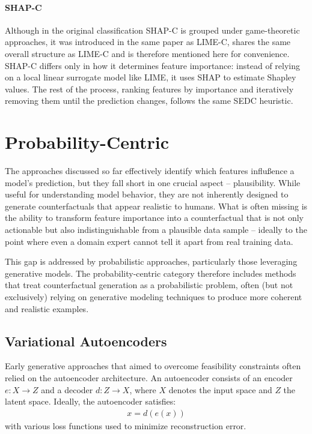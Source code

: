 \begin{methodparagraph}
    \paragraph{SHAP-C} Although in the original classification SHAP-C is grouped under game-theoretic approaches,
    it was introduced in the same paper as LIME-C, shares the same overall structure as LIME-C and is therefore mentioned here for convenience.
    SHAP-C differs only in how it determines feature importance: instead of relying on a local linear surrogate model like LIME,
    it uses SHAP \cite{lundberg2017unified} to estimate Shapley values.
    The rest of the process, ranking features by importance and iteratively removing them until the prediction changes,
    follows the same SEDC heuristic.
\end{methodparagraph}

\section{Probability-Centric}

The approaches discussed so far effectively identify which features influßence a model's prediction,
but they fall short in one crucial aspect -- plausibility. While useful for understanding model behavior,
they are not inherently designed to generate counterfactuals that appear realistic to humans. What is often missing is the ability to transform feature importance into a counterfactual that is not only actionable
but also indistinguishable from a plausible data sample -- ideally to the point where even a domain expert cannot tell it apart from real training data.

This gap is addressed by probabilistic approaches, particularly those leveraging generative models.
The probability-centric category therefore includes methods that treat counterfactual generation as a probabilistic problem,
often (but not exclusively) relying on generative modeling techniques to produce more coherent and realistic examples.

\subsection{Variational Autoencoders}

Early generative approaches that aimed to overcome feasibility constraints often relied on the autoencoder architecture.
An autoencoder consists of an encoder $e : X \to Z$ and a decoder $d : Z \to X$, where $X$ denotes the input space and $Z$ the latent space. Ideally, the autoencoder satisfies:
\begin{align}
    x = d(e(x))
\end{align}
with various loss functions used to minimize reconstruction error.

